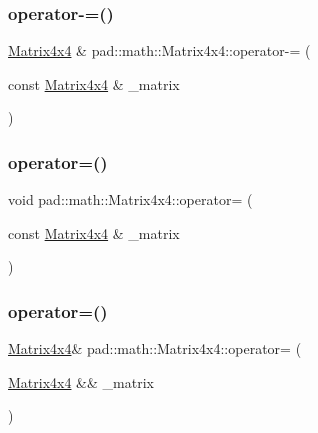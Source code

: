 \mbox{\label{structpad_1_1math_1_1_matrix4x4_a9ff7cd4357169ae04f5330dfa1a3bb64}} 
\subsubsection{\texorpdfstring{operator-\/=()}{operator-=()}}
{\footnotesize\ttfamily \mbox{\hyperlink{structpad_1_1math_1_1_matrix4x4}{Matrix4x4}} \& pad\+::math\+::\+Matrix4x4\+::operator-\/= (\begin{DoxyParamCaption}\item[{const \mbox{\hyperlink{structpad_1_1math_1_1_matrix4x4}{Matrix4x4}} \&}]{\+\_\+matrix }\end{DoxyParamCaption})}

\mbox{\label{structpad_1_1math_1_1_matrix4x4_ab14377405265dfb8c0adc47974598e7c}} 
\subsubsection{\texorpdfstring{operator=()}{operator=()}\hspace{0.1cm}{\footnotesize\ttfamily [1/2]}}
{\footnotesize\ttfamily void pad\+::math\+::\+Matrix4x4\+::operator= (\begin{DoxyParamCaption}\item[{const \mbox{\hyperlink{structpad_1_1math_1_1_matrix4x4}{Matrix4x4}} \&}]{\+\_\+matrix }\end{DoxyParamCaption})}

\mbox{\label{structpad_1_1math_1_1_matrix4x4_aab7a3a99bd9ca243483c4a9bdb11243d}} 
\subsubsection{\texorpdfstring{operator=()}{operator=()}\hspace{0.1cm}{\footnotesize\ttfamily [2/2]}}
{\footnotesize\ttfamily \mbox{\hyperlink{structpad_1_1math_1_1_matrix4x4}{Matrix4x4}}\& pad\+::math\+::\+Matrix4x4\+::operator= (\begin{DoxyParamCaption}\item[{\mbox{\hyperlink{structpad_1_1math_1_1_matrix4x4}{Matrix4x4}} \&\&}]{\+\_\+matrix }\end{DoxyParamCaption})\hspace{0.3cm}{\ttfamily [default]}}

